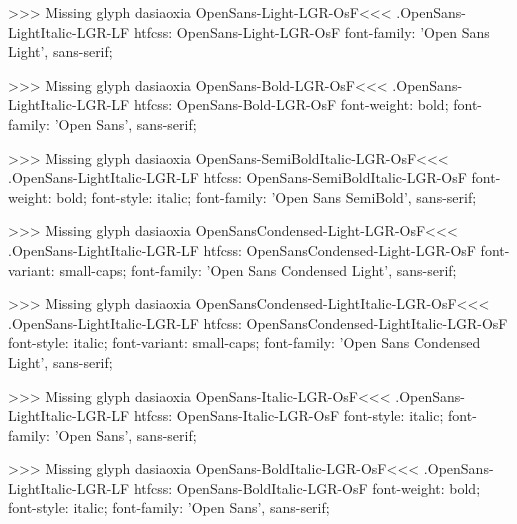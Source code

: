 >>>
Missing glyph	dasiaoxia
\<OpenSans-Light-LGR-OsF\><<<
.OpenSans-LightItalic-LGR-LF
htfcss:  OpenSans-Light-LGR-OsF  font-family: 'Open Sans Light', sans-serif;

>>>
Missing glyph	dasiaoxia
\<OpenSans-Bold-LGR-OsF\><<<
.OpenSans-LightItalic-LGR-LF
htfcss:  OpenSans-Bold-LGR-OsF  font-weight: bold; font-family: 'Open Sans', sans-serif;

>>>
Missing glyph	dasiaoxia
\<OpenSans-SemiBoldItalic-LGR-OsF\><<<
.OpenSans-LightItalic-LGR-LF
htfcss:  OpenSans-SemiBoldItalic-LGR-OsF  font-weight: bold; font-style: italic; font-family: 'Open Sans SemiBold', sans-serif;

>>>
Missing glyph	dasiaoxia
\<OpenSansCondensed-Light-LGR-OsF\><<<
.OpenSans-LightItalic-LGR-LF
htfcss:  OpenSansCondensed-Light-LGR-OsF  font-variant: small-caps; font-family: 'Open Sans Condensed Light', sans-serif;

>>>
Missing glyph	dasiaoxia
\<OpenSansCondensed-LightItalic-LGR-OsF\><<<
.OpenSans-LightItalic-LGR-LF
htfcss:  OpenSansCondensed-LightItalic-LGR-OsF  font-style: italic; font-variant: small-caps; font-family: 'Open Sans Condensed Light', sans-serif;

>>>
Missing glyph	dasiaoxia
\<OpenSans-Italic-LGR-OsF\><<<
.OpenSans-LightItalic-LGR-LF
htfcss:  OpenSans-Italic-LGR-OsF  font-style: italic; font-family: 'Open Sans', sans-serif;

>>>
Missing glyph	dasiaoxia
\<OpenSans-BoldItalic-LGR-OsF\><<<
.OpenSans-LightItalic-LGR-LF
htfcss:  OpenSans-BoldItalic-LGR-OsF  font-weight: bold; font-style: italic; font-family: 'Open Sans', sans-serif;

